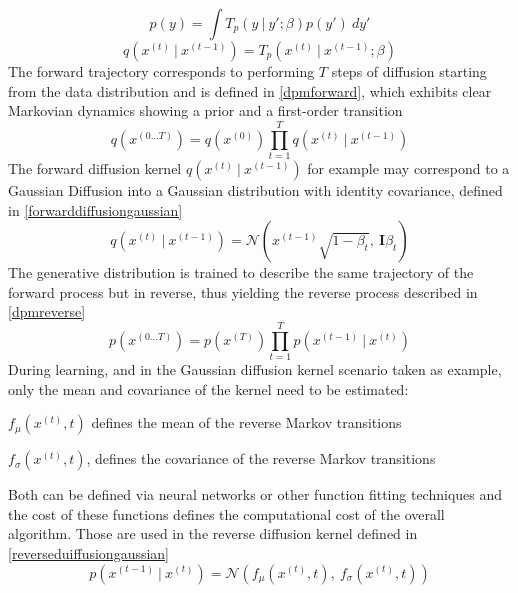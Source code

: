 \documentclass[conference]{IEEEtran}
\begin{document}
\begin{equation}
p(y)=\int T_p(y\:|\:y';\beta)p(y')\:dy'
\label{dpmpy}
\end{equation}
\begin{equation}
q\left(x^{(t)}\:|\:x^{(t-1)}\right) = T_p\left(x^{(t)}\:|\:x^{(t-1)};\beta\right)
\label{dpmqx}
\end{equation}
The forward trajectory corresponds to performing $T$ steps of diffusion starting from the data distribution and is defined in \eqref{dpmforward}, which exhibits clear Markovian dynamics showing a prior and a first-order transition
\begin{equation}
q\left(x^{(0\ldots T)}\right)=q\left(x^{(0)}\right)\prod^T_{t=1}q\left(x^{(t)}\:|\:x^{(t-1)}\right)
\label{dpmforward}
\end{equation}
The forward diffusion kernel $q\left(x^{(t)}\:|\:x^{(t-1)}\right)$ for example may correspond to a Gaussian Diffusion into a Gaussian distribution with identity covariance, defined in \eqref{forwarddiffusiongaussian}
\begin{equation}
q\left(x^{(t)}\:|\:x^{(t-1)}\right) = \mathcal{N}\left(x^{(t-1)}\sqrt{1-\beta_t},\:\mathbf{I}\beta_t\right)
\label{forwarddiffusiongaussian}
\end{equation}
The generative distribution is trained to describe the same trajectory of the forward process but in reverse, thus yielding the reverse process described in \eqref{dpmreverse}
\begin{equation}
p\left(x^{(0\ldots T)}\right)=p\left(x^{(T)}\right)\prod^T_{t=1}p\left(x^{(t-1)}\:|\:x^{(t)}\right)
\label{dpmreverse}
\end{equation}
During learning, and in the Gaussian diffusion kernel scenario taken as example, only the mean and covariance of the kernel need to be estimated:
\begin{list}{-}{}
	\item $f_\mu(x^{(t)}, t)$ defines the mean of the reverse Markov transitions
	\item $f_\sigma(x^{(t)}, t)$, defines the covariance of the reverse Markov transitions
\end{list}
Both can be defined via neural networks or other function fitting techniques and the cost of these functions defines the computational cost of the overall algorithm. Those are used in the reverse diffusion kernel defined in \eqref{reverseduiffusiongaussian}
\begin{equation}
p\left(x^{(t-1)}\:|\:x^{(t)}\right)=\mathcal{N}\left(f_\mu(x^{(t)},t),\:f_\sigma(x^{(t)},t)\right)
\label{reverseduiffusiongaussian}
\end{equation}
\end{document}

